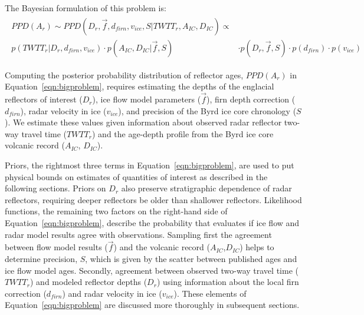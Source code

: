 The Bayesian formulation of this problem is:
\begin{equation}\label{eqn:bigproblem}
\begin{split} %
\begin{aligned}
PPD(A_r)  \sim  PPD(D_r,\vec{f},d_{firn},v_{ice},S | TWTT_r,A_{IC},D_{IC})  \propto & \\
        p(TWTT_r | D_r,d_{firn},v_{ice}) \cdot p(A_{IC},D_{IC} | \vec{f},S) & \cdot p(D_r,\vec{f},S) \cdot p(d_{firn})\cdot p(v_{ice})
\end{aligned}
\end{split}
\end{equation}

Computing the posterior probability distribution of reflector ages, $PPD(A_r)$ in Equation~\ref{eqn:bigproblem}, requires estimating the depths of the englacial reflectors of interest ($D_r$), ice flow model parameters ($\vec{f}$), firn depth correction ($d_{firn}$), radar velocity in ice ($v_{ice}$), and precision of the Byrd ice core chronology ($S$). We estimate these values given information about observed radar reflector two-way travel time ($TWTT_r$) and the age-depth profile from the Byrd ice core volcanic record ($A_{IC}$, $D_{IC}$). 


Priors, the rightmost three terms in Equation~\ref{eqn:bigproblem}, are used to put physical bounds on estimates of quantities of interest as described in the following sections. Priors on ${D_r}$ also preserve stratigraphic dependence of radar reflectors, requiring deeper reflectors be older than shallower reflectors. Likelihood functions, the remaining two factors on the right-hand side of Equation~\ref{eqn:bigproblem}, describe the probability that evaluates if ice flow and radar model results agree with observations. Sampling first the agreement between flow model results ($\vec{f}$) and the volcanic record ($A_{IC}$,$D_{IC}$) helps to determine precision, $S$, which is given by the scatter between published ages and ice flow model ages.  Secondly, agreement between observed two-way travel time ($TWTT_r$) and modeled reflector depths ($D_r$) using information about the local firn correction ($d_{firn}$) and radar velocity in ice ($v_{ice}$). These elements of Equation~\ref{eqn:bigproblem} are discussed more thoroughly in subsequent sections.

